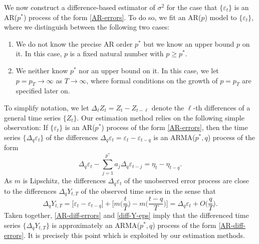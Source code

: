 We now construct a difference-based estimator of $\sigma^2$ for the case that $\{\varepsilon_t\}$ is an AR($p^*$) process of the form \eqref{AR-errors}. To do so, we fit an AR($p$) model to $\{\varepsilon_t\}$, where we distinguish between the following two cases: 
\begin{enumerate}[label=(\Alph*),leftmargin=0.75cm]
\item We do not know the precise AR order $p^*$ but we know an upper bound $p$ on it. In this case, $p$ is a fixed natural number with $ p \ge p^*$. 
\item We neither know $p^*$ nor an upper bound on it. In this case, we let $p = p_T \rightarrow \infty$ as $T \rightarrow \infty$, where formal conditions on the growth of $p = p_T$ are specified later on. 
\end{enumerate}
To simplify notation, we let $\Delta_\ell Z_t = Z_t - Z_{t-\ell}$ denote the $\ell$-th differences of a general time series $\{Z_t\}$. 
Our estimation method relies on the following simple observation: If $\{\varepsilon_t\}$ is an AR($p^*$) process of the form \eqref{AR-errors}, then the time series $\{ \Delta_q \varepsilon_t \}$ of the differences $\Delta_q \varepsilon_t = \varepsilon_t - \varepsilon_{t-q}$ is an ARMA($p^*,q$) process of the form 
\begin{equation}\label{AR-diff-errors} 
\Delta_q \varepsilon_t - \sum_{j=1}^{p^*} a_j \Delta_q \varepsilon_{t-j} = \eta_t - \eta_{t-q}. 
\end{equation}
As $m$ is Lipschitz, the differences $\Delta_q \varepsilon_t$ of the unobserved error process are close to the differences $\Delta_q Y_{t,T}$ of the observed time series in the sense that 
\begin{equation}\label{diff-Y-eps}
\Delta_q Y_{t,T} = \big[\varepsilon_t  - \varepsilon_{t-q} \big] + \Big[ m \Big(\frac{t}{T}\Big) - m \Big(\frac{t-q}{T}\Big) \Big] = \Delta_q \varepsilon_t + O \Big( \frac{q}{T} \Big).  
\end{equation} 
Taken together, \eqref{AR-diff-errors} and \eqref{diff-Y-eps} imply that the differenced time series $\{ \Delta_q Y_{t,T} \}$ is approximately an ARMA($p^*,q$) process of the form \eqref{AR-diff-errors}. It is precisely this point which is exploited by our estimation methods. 


